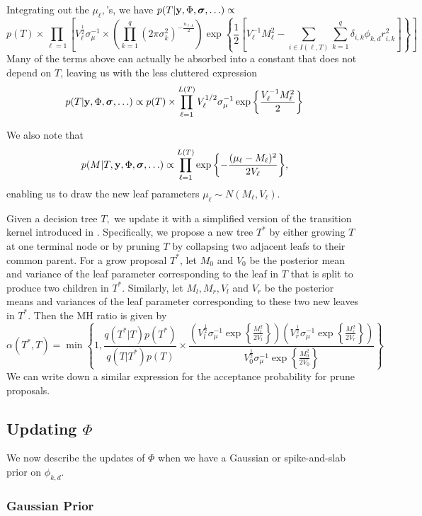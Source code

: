 \documentclass[12pt]{article}
\begin{document}
Integrating out the $\mu_{\ell},$'s, we have $p(T | \mathbf{y}, \Phi, \boldsymbol{\sigma}, \ldots) \propto $
$$
p(T) \times \prod_{\ell = 1}{\left[V_{\ell}^{\frac{1}{2}}\sigma_{\mu}^{-1} \times \left( \prod_{k = 1}^{q}{(2\pi\sigma^{2}_{k})^{-\frac{n_{\ell,k}}{2}}}\right)\exp\left\{\frac{1}{2}\left[V^{-1}_{\ell}M_{\ell}^{2} - \sum_{i \in I(\ell,T)}{\sum_{k = 1}^{q}{\delta_{i,k}\phi_{k,d}r_{i,k}^{2}}} \right] \right\}  \right]}
$$
Many of the terms above can actually be absorbed into a constant that does not depend on $T$, leaving us with the less cluttered expression
$$
p(T | \mathbf{y}, \Phi, \boldsymbol{\sigma}, \ldots) \propto p(T) \times \prod_{\ell = 1}^{L(T)}{V_{\ell}^{1/2}\sigma_{\mu}^{-1}\exp\left\{\frac{V^{-1}_{\ell}M_{\ell}^{2}}{2}\right\}}
$$

We also note that
$$
p(M | T, \mathbf{y}, \Phi, \boldsymbol{\sigma}, \ldots) \propto \prod_{\ell = 1}^{L(T)}{\exp\left\{-\frac{(\mu_{\ell} - M_{\ell})^{2}}{2V_{\ell}}\right\}},
$$
enabling us to draw the new leaf parameters $\mu_{\ell} \sim N(M_{\ell}, V_{\ell}).$

Given a decision tree $T,$ we update it with a simplified version of the transition kernel introduced in \citet{Chipman1998}.
Specifically, we propose a new tree $T^{*}$ by either growing $T$ at one terminal node or by pruning $T$ by collapsing two adjacent leafs to their common parent. 
For a grow proposal $T^{*}$, let $M_{0}$ and $V_{0}$ be the posterior mean and variance of the leaf parameter corresponding to the leaf in $T$ that is split to produce two children in $T^{*}.$
Similarly, let $M_{l}, M_{r}, V_{l}$ and $V_{r}$ be the posterior means and variances of the leaf parameter corresponding to these two new leaves in $T^{*}.$
Then the MH ratio is given by
$$
\alpha(T^{*},T) = \min\left\{1, \frac{q(T^{*} | T)p(T^{*})}{q(T | T^{*})p(T)} \times \frac{\left(V_{l}^{\frac{1}{2}}\sigma_{\mu}^{-1}\exp\left\{\frac{M_{l}^{2}}{2V_{l}}\right\}\right)\left(V_{r}^{\frac{1}{2}}\sigma_{\mu}^{-1}\exp\left\{\frac{M_{r}^{2}}{2V_{r}}\right\}\right)}{V_{0}^{\frac{1}{2}}\sigma_{\mu}^{-1}\exp\left\{\frac{M^{2}_{0}}{2V_{0}}\right\}}\right\}
$$
We can write down a similar expression for the acceptance probability for prune proposals. 

\subsection{Updating $\Phi$}

We now describe the updates of $\Phi$ when we have a Gaussian or spike-and-slab prior on $\phi_{k,d}.$
\subsubsection{Gaussian Prior}
\end{document}
